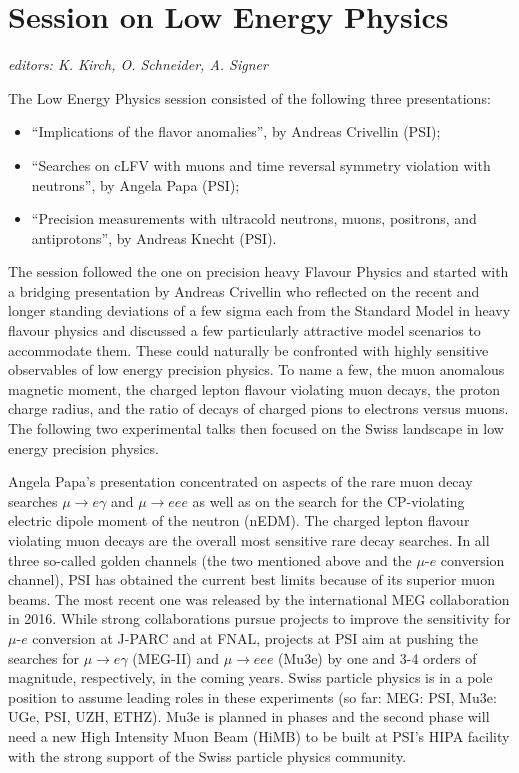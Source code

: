 \section{Session on Low Energy Physics}\label{lowenergy}{\it editors: K. Kirch, O. Schneider, A. Signer}


\noindent The Low Energy Physics session consisted of the following three  presentations:
\begin{itemize} \setlength{\itemsep}{-1ex}
\item ``Implications of the flavor anomalies'', by  Andreas Crivellin (PSI);
\item ``Searches on cLFV with muons and time reversal symmetry violation with
neutrons'', by Angela Papa (PSI);
\item ``Precision measurements with ultracold
neutrons, muons, positrons, and antiprotons'', by Andreas Knecht (PSI).
\end{itemize}

\noindent  The session followed the one on precision heavy Flavour Physics and
started with a bridging presentation by Andreas Crivellin who
reflected on the recent and longer standing deviations of a few sigma
each from the Standard Model in heavy flavour physics and discussed a
few particularly attractive model scenarios to accommodate them. These
could naturally be confronted with highly sensitive observables of low
energy precision physics. To name a few, the muon anomalous magnetic
moment, the charged lepton flavour violating muon decays, the proton
charge radius, and the ratio of decays of charged pions to electrons
versus muons. The following two experimental talks then focused on the
Swiss landscape in low energy precision physics.

\medskip
\noindent Angela Papa's presentation concentrated on aspects of the rare muon
decay searches $\mu\to e \gamma$ and $\mu\to eee$ as well as on the
search for the CP-violating electric dipole moment of the neutron
(nEDM).  The charged lepton flavour violating muon decays are the
overall most sensitive rare decay searches. 
In all three so-called golden channels (the two
mentioned above and the $\mu$-$e$ conversion channel), 
PSI has obtained the current best limits because of its superior muon beams. 
The most recent one was released by the international MEG
collaboration in 2016. While strong collaborations pursue projects to
improve the sensitivity for $\mu$-$e$ conversion at J-PARC and at
FNAL, projects at PSI aim at pushing the searches for $\mu\to e
\gamma$ (MEG-II) and $\mu\to eee$ (Mu3e) by one and 3-4 orders of
magnitude, respectively, in the coming years. Swiss particle physics is
in a pole position to assume leading roles in these experiments (so
far: MEG: PSI, Mu3e: UGe, PSI, UZH, ETHZ). Mu3e is planned in phases
and the second phase will need a new High Intensity Muon Beam (HiMB)
to be built at PSI's HIPA facility with the strong support of the Swiss
particle physics community.
\medskip 

